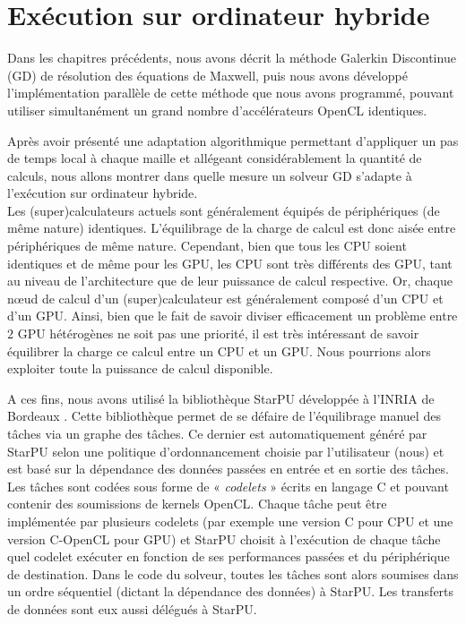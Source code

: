 \chapter{Exécution sur ordinateur hybride}
\label{chap:runtimes}

Dans les chapitres précédents, nous avons décrit la méthode
Galerkin Discontinue (GD)
de résolution des équations de Maxwell, puis nous avons développé
l'implémentation parallèle de cette méthode que nous avons programmé,
pouvant utiliser simultanément un grand nombre d'accélérateurs OpenCL
identiques.

Après avoir présenté une adaptation algorithmique permettant
d'appliquer un pas de temps local à chaque maille et allégeant
considérablement la quantité de calculs,
nous allons montrer dans quelle mesure un solveur GD
s'adapte à l'exécution sur ordinateur hybride.
\\


Les (super)calculateurs actuels sont généralement équipés
de périphériques (de même nature) identiques.
L'équilibrage de la charge de calcul est donc aisée
entre périphériques de même nature.
Cependant, bien que tous les
CPU soient identiques et de même pour les GPU, les CPU sont très différents
des GPU, tant au niveau de l'architecture que de leur puissance
de calcul respective.
Or, chaque nœud de calcul d'un (super)calculateur est généralement
composé d'un CPU et d'un GPU.
Ainsi, bien que le fait de savoir diviser efficacement un problème entre
$2$ GPU hétérogènes ne soit pas une priorité, il est très intéressant
de savoir équilibrer la charge ce calcul entre un CPU et un GPU.
Nous pourrions alors exploiter toute la puissance de calcul disponible.

A ces fins, nous avons utilisé la bibliothèque StarPU
développée à l'INRIA de Bordeaux \cite{augonnet2011starpu,augonnet2012starpu}.
Cette bibliothèque permet de se défaire de l'équilibrage manuel
des tâches via un graphe des tâches. Ce dernier est automatiquement
généré par StarPU selon une politique d'ordonnancement choisie
par l'utilisateur (nous) et est basé sur la dépendance des données
passées en entrée et en sortie des tâches.
Les tâches sont codées sous forme de « \textit{codelets} » écrits en
langage C et pouvant contenir des soumissions de kernels OpenCL.
Chaque tâche peut être implémentée par plusieurs codelets
(par exemple une version C pour CPU et une version C-OpenCL pour GPU)
et StarPU choisit à l'exécution de chaque tâche quel codelet exécuter
en fonction de ses performances passées et du périphérique de destination.
Dans le code du solveur, toutes les tâches sont alors soumises
dans un ordre séquentiel (dictant la dépendance des données) à StarPU.
Les transferts de données sont eux aussi délégués à StarPU.

